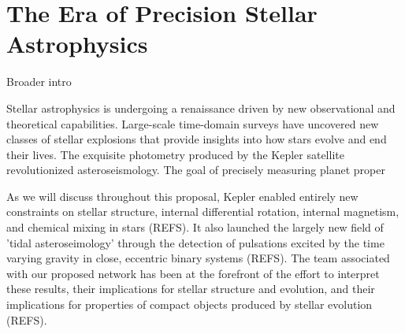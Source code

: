 \section{The Era of Precision Stellar Astrophysics}
Broader intro

Stellar astrophysics is undergoing a renaissance driven by new observational and theoretical capabilities.   Large-scale time-domain surveys have uncovered new classes of stellar explosions that provide insights into how stars evolve and end their lives.  The exquisite photometry produced by the Kepler satellite revolutionized asteroseismology.  The goal of precisely measuring planet proper 

As we will discuss throughout this proposal, Kepler enabled entirely new constraints on stellar structure, internal differential rotation, internal magnetism, and chemical mixing in stars (REFS).  It also launched the largely new field of 'tidal asteroseimology' through the detection of pulsations excited by the time varying gravity in close, eccentric binary systems (REFS). The team associated with our proposed network has been at the forefront of the effort to interpret these results, their implications for stellar structure and evolution, and their implications for properties of compact objects produced by stellar evolution (REFS).   

